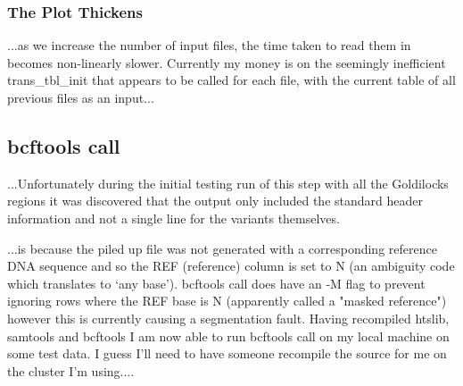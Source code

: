 \subsubsection{The Plot Thickens}

...as we increase the number of input files, the time taken to
read them in becomes non-linearly slower. Currently my money is on the seemingly
inefficient trans\_tbl\_init that appears to be called for each file, with the
current table of all previous files as an input...


\subsection{bcftools call}

...Unfortunately during the initial testing run of this step with all the
Goldilocks regions it was discovered that the output only included the standard
header information and not a single line for the variants themselves.

...is because the piled up file was not generated with a corresponding reference
DNA sequence and so the REF (reference) column is set to N (an ambiguity code
which translates to ‘any base’).  bcftools call does have an -M flag to prevent
ignoring rows where the REF base is N (apparently called a "masked reference")
however this is currently causing a segmentation fault.  Having recompiled
htslib, samtools and bcftools I am now able to run bcftools call on my local
machine on some test data. I guess I’ll need to have someone recompile the
source for me on the cluster I’m using....

